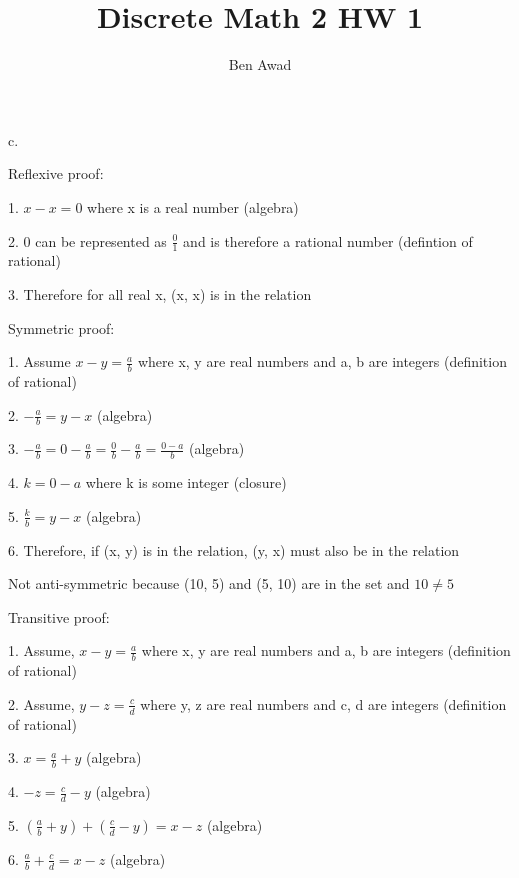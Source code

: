 \documentclass[12pt]{article}
\newenvironment{problem}[2][Problem]{\begin{trivlist}
\item[\hskip \labelsep {\bfseries #1}\hskip \labelsep {\bfseries #2.}]}{\end{trivlist}}
\begin{document}
 
 
\title{Discrete Math 2 HW 1}
\author{Ben Awad}
\maketitle
 
\begin{problem}{9.1.6}
\end{problem}
c. 

Reflexive proof:

1. $x - x = 0$ where x is a real number (algebra)

2. 0 can be represented as $\frac{0}{1}$ and is therefore a rational number (defintion of rational)

3. Therefore for all real x, (x, x) is in the relation

Symmetric proof:

1. Assume $x - y = \frac{a}{b}$ where x, y are real numbers and a, b are integers (definition of rational)

2. $-\frac{a}{b} = y - x$ (algebra)

3. $-\frac{a}{b} = 0 - \frac{a}{b} = \frac{0}{b} - \frac{a}{b} = \frac{0-a}{b}$ (algebra)

4. $k = 0-a$ where k is some integer (closure) 

5. $\frac{k}{b} = y - x$ (algebra)

6. Therefore, if (x, y) is in the relation, (y, x) must also be in the relation

Not anti-symmetric because (10, 5) and (5, 10) are in the set and $10 \neq 5$

Transitive proof:

1. Assume, $x - y = \frac{a}{b}$ where x, y are real numbers and a, b are integers (definition of rational)

2. Assume, $y - z = \frac{c}{d}$ where y, z are real numbers and c, d are integers (definition of rational)

3. $x = \frac{a}{b} + y$ (algebra)

4. $-z = \frac{c}{d} - y$ (algebra)

5. $(\frac{a}{b} + y) + (\frac{c}{d} - y) = x - z$ (algebra)

6. $\frac{a}{b} + \frac{c}{d} = x - z$ (algebra)
\end{document}

